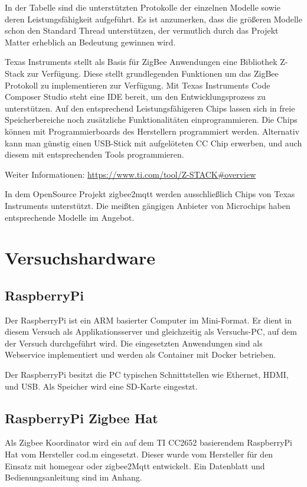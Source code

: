 In der Tabelle sind die unterstützten Protokolle der einzelnen Modelle sowie deren Leistungsfähigkeit aufgeführt.
Es ist anzumerken, dass die größeren Modelle schon den Standard Thread unterstützen, der vermutlich durch das
Projekt \grqq Matter\grqq{} erheblich an Bedeutung gewinnen wird.

Texas Instruments stellt als Basis für ZigBee Anwendungen eine Bibliothek \grqq Z-Stack\grqq{} zur Verfügung. Diese stellt grundlegenden 
Funktionen um das ZigBee Protokoll zu implementieren zur Verfügung. Mit Texas Instruments Code Composer Studio steht eine IDE bereit,
um den Entwicklungsprozess zu unterstützen. Auf den entsprechend Leistungsfähigeren Chips lassen sich in freie Speicherbereiche noch zusätzliche
Funktionalitäten einprogrammieren. Die Chips können mit Programmierboards des Herstellern programmiert werden. Alternativ kann man
günstig einen USB-Stick mit aufgelöteten CC Chip erwerben, und auch diesem mit entsprechenden Tools programmieren.

Weiter Informationen: \url{https://www.ti.com/tool/Z-STACK#overview}

In dem OpenSource Projekt zigbee2mqtt werden ausschließlich Chips von Texas Instruments unterstützt. Die meißten gängigen Anbieter von Microchips 
haben entsprechende Modelle im Angebot. 

\section{Versuchshardware}

\subsection{RaspberryPi}

Der RaspberryPi ist ein ARM basierter Computer im Mini-Format. Er dient in diesem Versuch als Applikationsserver und gleichzeitig als Versuchs-PC, 
auf dem der Versuch durchgeführt wird. Die eingesetzten Anwendungen sind 
als Webservice implementiert und werden als Container mit Docker betrieben.

Der RaspberryPi besitzt die PC typischen Schnittstellen wie Ethernet, HDMI, und USB. Als Speicher wird eine SD-Karte eingestzt. 

\subsection{RaspberryPi Zigbee Hat}

Als Zigbee Koordinator wird ein auf dem TI CC2652 basierendem RaspberryPi Hat vom Hersteller \grqq cod.m\grqq{} eingesetzt. Dieser wurde vom Hersteller
für den Einsatz mit \grqq homegear\grqq{} oder \grqq zigbee2Mqtt\grqq{} entwickelt. Ein Datenblatt und Bedienungsanleitung sind im Anhang.

